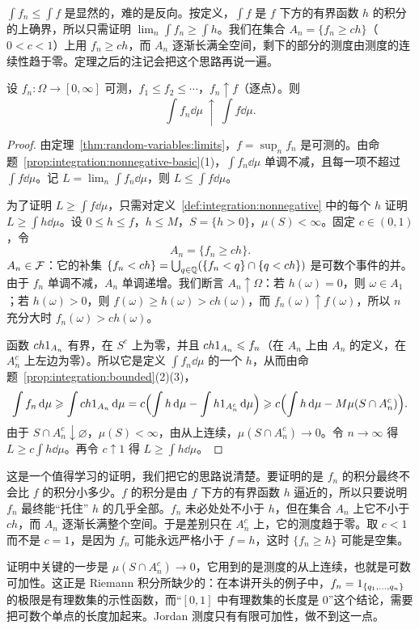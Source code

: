 \begin{remark}[证明思路]
$\int f_n\leqslant\int f$ 是显然的，难的是反向。按定义，$\int f$ 是 $f$ 下方的有界函数 $h$ 的积分的上确界，所以只需证明 $\lim_n\int f_n\geqslant\int h$。我们在集合 $A_n=\{f_n\geqslant ch\}$（$0<c<1$）上用 $f_n\geqslant ch$，而 $A_n$ 逐渐长满全空间，剩下的部分的测度由测度的连续性趋于零。定理之后的注记会把这个思路再说一遍。
\end{remark}

\begin{theorem}\label{thm:integration:mct}
设 $f_n:\Omega\to[0,\infty]$ 可测，$f_1\leqslant f_2\leqslant\cdots$，$f_n\uparrow f$（逐点）。则
\[
\int f_n\dd\mu\ \uparrow\ \int f\dd\mu .
\]
\end{theorem}
\begin{proof}
由定理~\ref{thm:random-variables:limits}，$f=\sup_nf_n$ 是可测的。由命题~\ref{prop:integration:nonnegative-basic}(1)，$\int f_n\dd\mu$ 单调不减，且每一项不超过 $\int f\dd\mu$。记 $L=\lim_n\int f_n\dd\mu$，则 $L\leqslant\int f\dd\mu$。

为了证明 $L\geqslant\int f\dd\mu$，只需对定义~\ref{def:integration:nonnegative} 中的每个 $h$ 证明 $L\geqslant\int h\dd\mu$。设 $0\leqslant h\leqslant f$，$h\leqslant M$，$S=\{h>0\}$，$\mu(S)<\infty$。固定 $c\in(0,1)$，令
\[
A_n=\{f_n\geqslant ch\}.
\]
$A_n\in\mathcal{F}$：它的补集 $\{f_n<ch\}=\bigcup_{q\in\mathbb{Q}}(\{f_n<q\}\cap\{q<ch\})$ 是可数个事件的并。由于 $f_n$ 单调不减，$A_n$ 单调递增。我们断言 $A_n\uparrow\Omega$：若 $h(\omega)=0$，则 $\omega\in A_1$；若 $h(\omega)>0$，则 $f(\omega)\geqslant h(\omega)>ch(\omega)$，而 $f_n(\omega)\uparrow f(\omega)$，所以 $n$ 充分大时 $f_n(\omega)>ch(\omega)$。

函数 $ch1_{A_n}$ 有界，在 $S^c$ 上为零，并且 $ch1_{A_n}\leqslant f_n$（在 $A_n$ 上由 $A_n$ 的定义，在 $A_n^c$ 上左边为零）。所以它是定义 $\int f_n\dd\mu$ 的一个 $h$，从而由命题~\ref{prop:integration:bounded}(2)(3)，
\[
\int f_n\,\mathrm{d}\mu\geqslant\int ch1_{A_n}\,\mathrm{d}\mu=c\Bigl(\int h\,\mathrm{d}\mu-\int h1_{A_n^c}\,\mathrm{d}\mu\Bigr)\geqslant c\Bigl(\int h\,\mathrm{d}\mu-M\mu(S\cap A_n^c)\Bigr).
\]
由于 $S\cap A_n^c\downarrow\varnothing$，$\mu(S)<\infty$，由从上连续，$\mu(S\cap A_n^c)\to0$。令 $n\to\infty$ 得 $L\geqslant c\int h\dd\mu$。再令 $c\uparrow1$ 得 $L\geqslant\int h\dd\mu$。
\end{proof}

\begin{remark}
这是一个值得学习的证明，我们把它的思路说清楚。要证明的是 $f_n$ 的积分最终不会比 $f$ 的积分小多少。$f$ 的积分是由 $f$ 下方的有界函数 $h$ 逼近的，所以只要说明 $f_n$ 最终能“托住” $h$ 的几乎全部。$f_n$ 未必处处不小于 $h$，但在集合 $A_n$ 上它不小于 $ch$，而 $A_n$ 逐渐长满整个空间。于是差别只在 $A_n^c$ 上，它的测度趋于零。取 $c<1$ 而不是 $c=1$，是因为 $f_n$ 可能永远严格小于 $f=h$，这时 $\{f_n\geqslant h\}$ 可能是空集。

证明中关键的一步是 $\mu(S\cap A_n^c)\to0$，它用到的是测度的从上连续，也就是可数可加性。这正是 Riemann 积分所缺少的：在本讲开头的例子中，$f_n=1_{\{q_1,\dots,q_n\}}$ 的极限是有理数集的示性函数，而“$[0,1]$ 中有理数集的长度是 $0$”这个结论，需要把可数个单点的长度加起来。Jordan 测度只有有限可加性，做不到这一点。
\end{remark}

